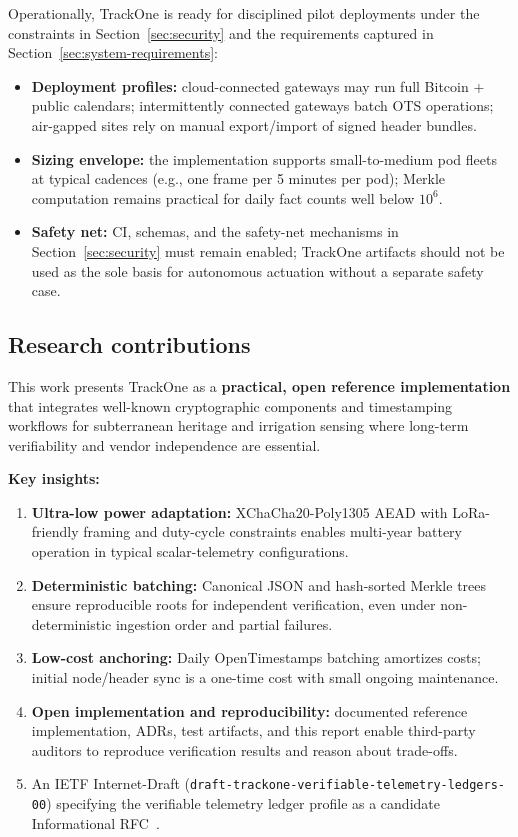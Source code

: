 Operationally, TrackOne is ready for disciplined pilot deployments under the constraints in Section~\ref{sec:security} and the requirements captured in Section~\ref{sec:system-requirements}:
\begin{itemize}[nosep]
    \item \textbf{Deployment profiles:} cloud-connected gateways may run full Bitcoin + public calendars; intermittently connected gateways batch \ac{OTS} operations; air-gapped sites rely on manual export/import of signed header bundles.
    \item \textbf{Sizing envelope:} the implementation supports small-to-medium pod fleets at typical cadences (e.g., one frame per 5 minutes per pod); Merkle computation remains practical for daily fact counts well below $10^6$.
    \item \textbf{Safety net:} \ac{CI}, schemas, and the safety-net mechanisms in Section~\ref{sec:security} must remain enabled; TrackOne artifacts should not be used as the sole basis for autonomous actuation without a separate safety case.
\end{itemize}

\subsection{Research contributions}
\label{subsec:research-contributions}

This work presents TrackOne as a \textbf{practical, open reference implementation} that integrates well-known cryptographic components and timestamping workflows for subterranean heritage and irrigation sensing where long-term verifiability and vendor independence are essential.

\textbf{Key insights:}
\begin{enumerate}[nosep]
    \item \textbf{Ultra-low power adaptation:} XChaCha20-Poly1305 \ac{AEAD} with \ac{LoRa}-friendly framing and duty-cycle constraints enables multi-year battery operation in typical scalar-telemetry configurations.
    \item \textbf{Deterministic batching:} Canonical \ac{JSON} and hash-sorted Merkle trees ensure reproducible roots for independent verification, even under non-deterministic ingestion order and partial failures.
    \item \textbf{Low-cost anchoring:} Daily OpenTimestamps batching amortizes costs; initial node/header sync is a one-time cost with small ongoing maintenance.
    \item \textbf{Open implementation and reproducibility:} documented reference implementation, \ac{ADR}s, test artifacts, and this report enable third-party auditors to reproduce verification results and reason about trade-offs.
\item An \ac{IETF} Internet-Draft (\texttt{draft-trackone-verifiable-telemetry-ledgers-00})
    specifying the verifiable telemetry ledger profile as a candidate
    Informational \ac{RFC}~\cite{draft-trackone-vtl-00}.
\end{enumerate}

